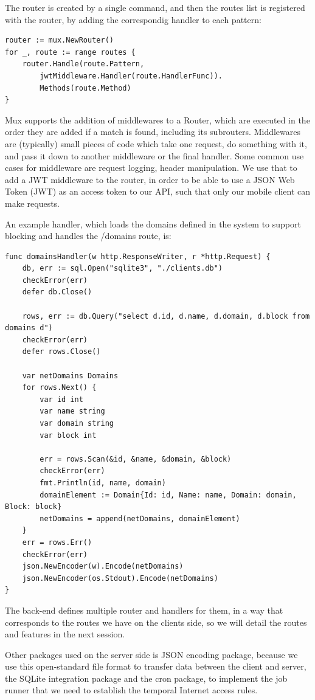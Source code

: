 The router is created by a single command, and then the routes list is registered with the router, by adding the correspondig handler to each pattern:

\begin{lstlisting}[language=Golang]
router := mux.NewRouter()
for _, route := range routes {
	router.Handle(route.Pattern, 
		jwtMiddleware.Handler(route.HandlerFunc)).
		Methods(route.Method)
}
\end{lstlisting}

Mux supports the addition of middlewares to a Router, which are executed in the order they are added if a match is found, including its subrouters. Middlewares are (typically) small pieces of code which take one request, do something with it, and pass it down to another middleware or the final handler. Some common use cases for middleware are request logging, header manipulation. We use that to add a JWT middleware to the router, in order to be able to use a JSON Web Token (JWT) as an access token to our API, such that only our mobile client can make requests.

An example handler, which loads the domains defined in the system to support blocking and handles the /domains route, is:

\begin{lstlisting}[language=Golang]
func domainsHandler(w http.ResponseWriter, r *http.Request) {
	db, err := sql.Open("sqlite3", "./clients.db")
	checkError(err)
	defer db.Close()

	rows, err := db.Query("select d.id, d.name, d.domain, d.block from domains d")
	checkError(err)
	defer rows.Close()

	var netDomains Domains
	for rows.Next() {
		var id int
		var name string
		var domain string
		var block int

		err = rows.Scan(&id, &name, &domain, &block)
		checkError(err)
		fmt.Println(id, name, domain)
		domainElement := Domain{Id: id, Name: name, Domain: domain, Block: block}
		netDomains = append(netDomains, domainElement)
	}
	err = rows.Err()
	checkError(err)
	json.NewEncoder(w).Encode(netDomains)
	json.NewEncoder(os.Stdout).Encode(netDomains)
}
\end{lstlisting}

The back-end defines multiple router and handlers for them, in a way that corresponds to the routes we have on the clients side, so we will detail the routes and features in the next session.

Other packages used on the server side is JSON encoding package, because we use this open-standard file format to transfer data between the client and server, the SQLite integration package and the cron package, to implement the job runner that we need to establish the temporal Internet access rules.

